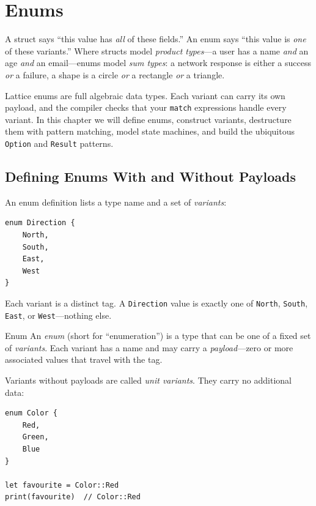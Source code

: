 \chapter{Enums}\label{ch:enums}

A struct says ``this value has \emph{all} of these fields.'' An enum says
``this value is \emph{one} of these variants.'' Where structs model
\emph{product types}---a user has a name \emph{and} an age \emph{and} an
email---enums model \emph{sum types}: a network response is either a success
\emph{or} a failure, a shape is a circle \emph{or} a rectangle \emph{or}
a triangle.

Lattice enums are full algebraic data types. Each variant can carry its own
payload, and the compiler checks that your \lstinline|match| expressions
handle every variant. In this chapter we will define enums, construct
variants, destructure them with pattern matching, model state machines,
and build the ubiquitous \lstinline|Option| and \lstinline|Result| patterns.

\section{Defining Enums With and Without Payloads}\label{sec:enum-defining}

An enum definition lists a type name and a set of \emph{variants}:

\begin{lstlisting}[language=Lattice, caption={A basic enum with unit variants}]
enum Direction {
    North,
    South,
    East,
    West
}
\end{lstlisting}

Each variant is a distinct tag. A \lstinline|Direction| value is exactly
one of \lstinline|North|, \lstinline|South|, \lstinline|East|, or
\lstinline|West|---nothing else.

\begin{defnbox}{Enum}
An \emph{enum} (short for ``enumeration'') is a type that can be one of
a fixed set of \emph{variants}. Each variant has a name and may carry a
\emph{payload}---zero or more associated values that travel with the tag.
\end{defnbox}

Variants without payloads are called \emph{unit variants}. They carry no
additional data:

\begin{lstlisting}[language=Lattice, caption={Unit variants carry no data}]
enum Color {
    Red,
    Green,
    Blue
}

let favourite = Color::Red
print(favourite)  // Color::Red
\end{lstlisting}

